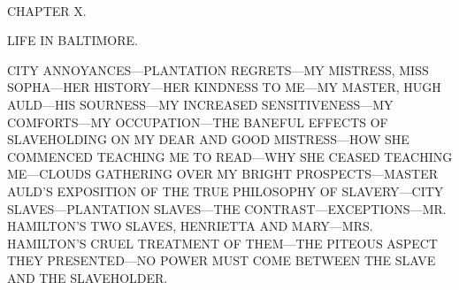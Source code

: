 {}

~

{CHAPTER X.}

LIFE IN BALTIMORE.

{CITY ANNOYANCES---PLANTATION REGRETS---MY MISTRESS, MISS SOPHA---HER
HISTORY---HER KINDNESS TO ME---MY MASTER, HUGH AULD---HIS SOURNESS---MY
INCREASED SENSITIVENESS---MY COMFORTS---MY OCCUPATION---THE BANEFUL
EFFECTS OF SLAVEHOLDING ON MY DEAR AND GOOD MISTRESS---HOW SHE COMMENCED
TEACHING ME TO READ---WHY SHE CEASED TEACHING ME---CLOUDS GATHERING OVER
MY BRIGHT PROSPECTS---MASTER AULD'S EXPOSITION OF THE TRUE PHILOSOPHY OF
SLAVERY---CITY SLAVES---PLANTATION SLAVES---THE
CONTRAST---EXCEPTIONS---MR. HAMILTON'S TWO SLAVES, HENRIETTA AND
MARY---MRS. HAMILTON'S CRUEL TREATMENT OF THEM---THE PITEOUS ASPECT THEY
PRESENTED---NO POWER MUST COME BETWEEN THE SLAVE AND THE SLAVEHOLDER.}

